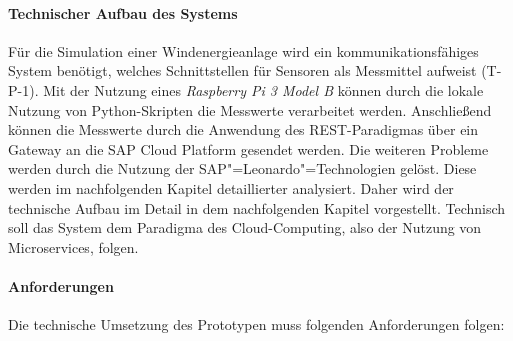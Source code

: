 \paragraph{Technischer Aufbau des Systems} \label{technischeraufbau}

Für die Simulation einer Windenergieanlage wird ein kommunikationsfähiges System benötigt, welches Schnittstellen für Sensoren als Messmittel aufweist (T-P-1). Mit der Nutzung eines \textit{Raspberry Pi 3 Model B} können durch die lokale Nutzung von Python-Skripten die Messwerte verarbeitet werden. Anschließend können die Messwerte durch die Anwendung des REST-Paradigmas über ein Gateway an die SAP Cloud Platform gesendet werden. Die weiteren Probleme werden durch die Nutzung der SAP"=Leonardo"=Technologien gelöst. Diese werden im nachfolgenden Kapitel detaillierter analysiert. Daher wird der technische Aufbau im Detail in dem nachfolgenden Kapitel vorgestellt. Technisch soll das System dem Paradigma des Cloud-Computing, also der Nutzung von Microservices, folgen.

\paragraph{Anforderungen}\label{anftechnik} Die technische Umsetzung des Prototypen muss folgenden Anforderungen folgen:

